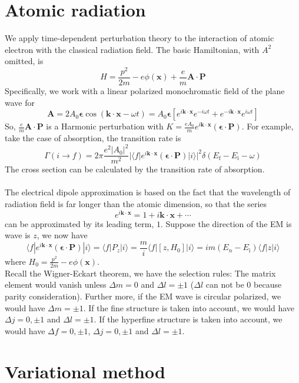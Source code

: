 \documentclass[cyan]{elegantnote}
\begin{document}
\section{Atomic radiation}
We apply time-dependent perturbation theory to the interaction of atomic electron with the classical radiation field.
The basic Hamiltonian, with $A^2$ omitted, is
\[H = \frac{p^2}{2m} - e\phi(\bm{x}) + \frac{e}{m}\bm{A}\cdot\bm{P}\]
Specifically, we work with a linear polarized monochromatic field of the plane wave for
\[\bm{A} = 2A_0\bm{\epsilon}\cos(\bm{k}\cdot\bm{x}-\omega t) = A_0\bm{\epsilon} [e^{i\bm{k}\cdot\bm{x}}e^{-i\omega t}  + e^{-i\bm{k}\cdot\bm{x}}e^{i\omega t} ]\]
So, $\frac{e}{m}\bm{A}\cdot\bm{P}$ is a Harmonic perturbation with $K = \frac{eA_0}{m} e^{i\bm{k}\cdot\bm{x}} (\bm{\epsilon}\cdot\bm{P})$.
For example, take the case of absorption, the transition rate is
\[\Gamma(i \to f) = 2\pi \frac{e^2|A_0|^2}{m^2} |\langle f |e^{i\bm{k}\cdot\bm{x}} (\bm{\epsilon}\cdot\bm{P}) |i \rangle|^2 \delta(E_{\mathrm{f}}-E_{\mathrm{i}}-\omega)\]
The cross section can be calculated by the transition rate of absorption.\\ \\
The electrical dipole approximation is based on the fact that the wavelength of radiation field is far longer than the atomic dimension, so that the series
\[e^{i\bm{k}\cdot\bm{x}} = 1+ i\bm{k}\cdot\bm{x}+\cdots\]
can be approximated by its leading term, $1$. Suppose the direction of the EM is wave is $z$, we now have
\[\langle f |e^{i\bm{k}\cdot\bm{x}} (\bm{\epsilon}\cdot\bm{P}) |i \rangle = \langle f | P_z |i \rangle = \frac{m}{i} \langle f |  [z,H_0] |i \rangle = im(E_n-E_{\mathrm{i}})\langle f | z |i \rangle  \]
where $H_0 = \frac{p^2}{2m} - e\phi(\bm{x})$.\\
Recall the Wigner-Eckart theorem, we have the selection rules: The matrix element would vanish unless $\Delta m = 0$ and $\Delta l = \pm 1$ ($\Delta l $ can not be $0$ because parity consideration). Further more, if the EM wave is circular polarized, we would have $\Delta m = \pm 1$. If the fine structure is taken into account, we would have $\Delta j = 0,\pm 1$ and $\Delta l = \pm 1$. If the hyperfine structure is taken into account, we would have $\Delta f = 0,\pm 1$, $\Delta j = 0,\pm 1$ and $\Delta l = \pm 1$. 

\section{Variational method}
\end{document}
